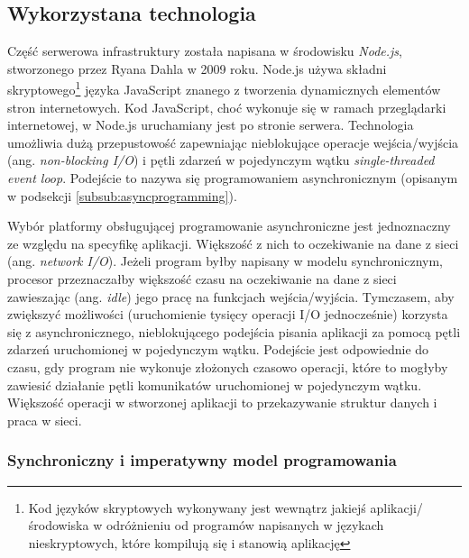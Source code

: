 \subsection{Wykorzystana technologia}

Część serwerowa infrastruktury została napisana w środowisku \emph{Node.js}, stworzonego przez Ryana Dahla w 2009 roku. Node.js używa składni skryptowego\footnote{Kod języków skryptowych wykonywany jest wewnątrz jakiejś aplikacji/środowiska w odróżnieniu od programów napisanych w językach nieskryptowych, które kompilują się i stanowią aplikację} języka JavaScript znanego z tworzenia dynamicznych elementów stron internetowych. Kod JavaScript, choć wykonuje się w ramach przeglądarki internetowej, w Node.js uruchamiany jest po stronie serwera. Technologia umożliwia dużą przepustowość zapewniając nieblokujące operacje wejścia/wyjścia (ang. \emph{non-blocking I/O}) i pętli zdarzeń w pojedynczym wątku \emph{single-threaded event loop}. Podejście to nazywa się programowaniem asynchronicznym (opisanym w podsekcji \ref{subsub:asyncprogramming}).

Wybór platformy obsługującej programowanie asynchroniczne jest jednoznaczny ze względu na specyfikę aplikacji. Większość z nich to oczekiwanie na dane z sieci (ang. \emph{network I/O}). Jeżeli program byłby napisany w modelu synchronicznym, procesor przeznaczałby większość czasu na oczekiwanie na dane z sieci zawieszając (ang. \emph{idle}) jego pracę na funkcjach wejścia/wyjścia. Tymczasem, aby zwiększyć możliwości (uruchomienie tysięcy operacji I/O jednocześnie) korzysta się z asynchronicznego, nieblokującego podejścia pisania aplikacji za pomocą pętli zdarzeń uruchomionej w pojedynczym wątku. Podejście jest odpowiednie do czasu, gdy program nie wykonuje złożonych czasowo operacji, które to mogłyby zawiesić działanie pętli komunikatów uruchomionej w pojedynczym wątku. Większość operacji w stworzonej aplikacji to przekazywanie struktur danych i praca w sieci.

\subsubsection{Synchroniczny i imperatywny model programowania}

